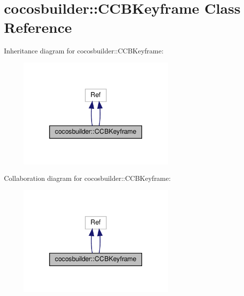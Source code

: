 \hypertarget{classcocosbuilder_1_1CCBKeyframe}{}\section{cocosbuilder\+:\+:C\+C\+B\+Keyframe Class Reference}
\label{classcocosbuilder_1_1CCBKeyframe}


Inheritance diagram for cocosbuilder\+:\+:C\+C\+B\+Keyframe\+:
\nopagebreak
\begin{figure}[H]
\begin{center}
\leavevmode
\includegraphics[width=221pt]{classcocosbuilder_1_1CCBKeyframe__inherit__graph}
\end{center}
\end{figure}


Collaboration diagram for cocosbuilder\+:\+:C\+C\+B\+Keyframe\+:
\nopagebreak
\begin{figure}[H]
\begin{center}
\leavevmode
\includegraphics[width=221pt]{classcocosbuilder_1_1CCBKeyframe__coll__graph}
\end{center}
\end{figure}
